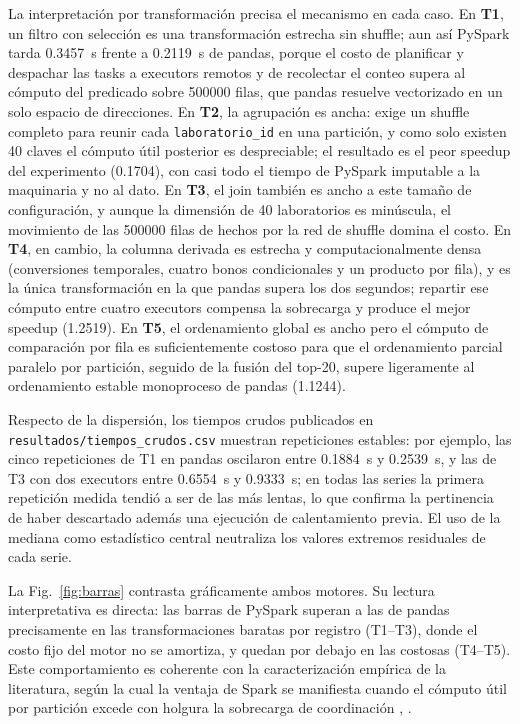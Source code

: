 \documentclass[10pt,journal]{IEEEtran}
\begin{document}
La interpretaci\'on por transformaci\'on precisa el mecanismo en cada caso. En
\textbf{T1}, un filtro con selecci\'on es una transformaci\'on estrecha sin
shuffle; aun as\'i PySpark tarda \SI{0.3457}{\second} frente a
\SI{0.2119}{\second} de pandas, porque el costo de planificar y despachar las
tasks a executors remotos y de recolectar el conteo supera al c\'omputo del
predicado sobre \num{500000} filas, que pandas resuelve vectorizado en un solo
espacio de direcciones. En \textbf{T2}, la agrupaci\'on es ancha: exige un
shuffle completo para reunir cada \texttt{laboratorio\_id} en una partici\'on,
y como solo existen 40 claves el c\'omputo \'util posterior es despreciable; el
resultado es el peor speedup del experimento (\num{0.1704}), con casi todo el
tiempo de PySpark imputable a la maquinaria y no al dato. En \textbf{T3}, el
join tambi\'en es ancho a este tama\~no de configuraci\'on, y aunque la
dimensi\'on de 40 laboratorios es min\'uscula, el movimiento de las
\num{500000} filas de hechos por la red de shuffle domina el costo. En
\textbf{T4}, en cambio, la columna derivada es estrecha y computacionalmente
densa (conversiones temporales, cuatro bonos condicionales y un producto por
fila), y es la \'unica transformaci\'on en la que pandas supera los dos
segundos; repartir ese c\'omputo entre cuatro executors compensa la sobrecarga
y produce el mejor speedup (\num{1.2519}). En \textbf{T5}, el ordenamiento
global es ancho pero el c\'omputo de comparaci\'on por fila es suficientemente
costoso para que el ordenamiento parcial paralelo por partici\'on, seguido de
la fusi\'on del top-20, supere ligeramente al ordenamiento estable
monoproceso de pandas (\num{1.1244}).

Respecto de la dispersi\'on, los tiempos crudos publicados en
\texttt{resultados/tiempos\_crudos.csv} muestran repeticiones estables: por
ejemplo, las cinco repeticiones de T1 en pandas oscilaron entre
\SI{0.1884}{\second} y \SI{0.2539}{\second}, y las de T3 con dos executors
entre \SI{0.6554}{\second} y \SI{0.9333}{\second}; en todas las series la
primera repetici\'on medida tendi\'o a ser de las m\'as lentas, lo que confirma
la pertinencia de haber descartado adem\'as una ejecuci\'on de calentamiento
previa. El uso de la mediana como estad\'istico central neutraliza los valores
extremos residuales de cada serie.

La Fig.~\ref{fig:barras} contrasta gr\'aficamente ambos motores. Su lectura
interpretativa es directa: las barras de PySpark superan a las de pandas
precisamente en las transformaciones baratas por registro (T1--T3), donde el
costo fijo del motor no se amortiza, y quedan por debajo en las costosas
(T4--T5). Este comportamiento es coherente con la caracterizaci\'on emp\'irica
de la literatura, seg\'un la cual la ventaja de Spark se manifiesta cuando el
c\'omputo \'util por partici\'on excede con holgura la sobrecarga de
coordinaci\'on \cite{ahmed2020}, \cite{zaharia2016}.
\end{document}

